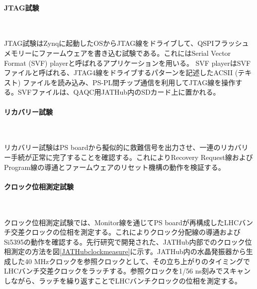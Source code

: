 \paragraph{JTAG試験}　\par
JTAG試験はZynqに起動したOSからJTAG線をドライブして、QSPIフラッシュメモリーにファームウェアを書き込む試験である。これにはSerial Vector Format (SVF) playerと呼ばれるアプリケーションを用いる。
SVF playerはSVFファイルと呼ばれる、JTAG4線をドライブするパターンを記述したACSII (テキスト) ファイルを読み込み、PS-PL間チップ通信を利用してJTAG線を操作する。SVFファイルは、QAQC用JATHub内のSDカード上に置かれる。

\paragraph{リカバリー試験}　\par
リカバリー試験はPS boardから擬似的に救難信号を出力させ、一連のリカバリー手続が正常に完了することを確認する。これによりRecovery Request線およびProgram線の導通とファームウェアのリセット機構の動作を検証する。

\paragraph{クロック位相測定試験}　\par
クロック位相測定試験では、Monitor線を通じてPS boardが再構成したLHCバンチ交差クロックの位相を測定する。これによりクロック分配線の導通およびSi5395の動作を確認する。先行研究で開発された、JATHub内部でのクロック位相測定の方法を図\ref{JATHubclockmeasure}に示す。JATHub内の水晶発振器から生成した40 MHzクロックを参照クロックとして、その立ち上がりのタイミングでLHCバンチ交差クロックをラッチする。参照クロックを1/56 ns刻みでスキャンしながら、ラッチを繰り返すことでLHCバンチクロックの位相を測定する。

